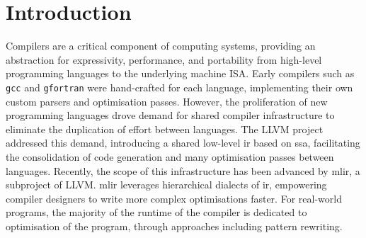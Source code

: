 \chapter{Introduction}
\label{chap:introduction}

%
%





Compilers are a critical component of computing systems, providing an abstraction for expressivity, performance, and portability from high-level programming languages to the underlying machine ISA.
Early compilers such as \texttt{gcc} and \texttt{gfortran} were hand-crafted for each language, implementing their own custom parsers and optimisation passes. However, the proliferation of new programming languages drove demand for shared compiler infrastructure to eliminate the duplication of effort between languages. The LLVM project addressed this demand, introducing a shared low-level \ac{ir} based on \ac{ssa}, facilitating the consolidation of code generation and many optimisation passes between languages. Recently, the scope of this infrastructure has been advanced by \ac{mlir}, a subproject of LLVM. \ac{mlir} leverages hierarchical dialects of \ac{ir}, empowering compiler designers to write more complex optimisations faster.
For real-world programs, the majority of the runtime of the compiler is dedicated to optimisation of the program, through approaches including pattern rewriting.



